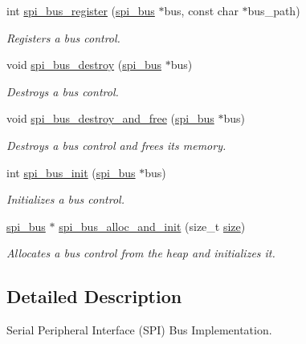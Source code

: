 \begin{DoxyCompactItemize}
\item 
int \mbox{\hyperlink{group__SPI_ga4e6ca0b1d473a6be4fbbefa2ed1a55f2}{spi\+\_\+bus\+\_\+register}} (\mbox{\hyperlink{structspi__bus}{spi\+\_\+bus}} $\ast$bus, const char $\ast$bus\+\_\+path)
\begin{DoxyCompactList}\small\item\em Registers a bus control. \end{DoxyCompactList}\item 
void \mbox{\hyperlink{group__SPI_ga6d316300e2bb231728d32b5dda355dcd}{spi\+\_\+bus\+\_\+destroy}} (\mbox{\hyperlink{structspi__bus}{spi\+\_\+bus}} $\ast$bus)
\begin{DoxyCompactList}\small\item\em Destroys a bus control. \end{DoxyCompactList}\item 
void \mbox{\hyperlink{group__SPI_ga6c6868bad5d8e9ea136b23947dd9a7a6}{spi\+\_\+bus\+\_\+destroy\+\_\+and\+\_\+free}} (\mbox{\hyperlink{structspi__bus}{spi\+\_\+bus}} $\ast$bus)
\begin{DoxyCompactList}\small\item\em Destroys a bus control and frees its memory. \end{DoxyCompactList}\item 
int \mbox{\hyperlink{group__SPI_ga262496c8e444706de1774f57e65fb783}{spi\+\_\+bus\+\_\+init}} (\mbox{\hyperlink{structspi__bus}{spi\+\_\+bus}} $\ast$bus)
\begin{DoxyCompactList}\small\item\em Initializes a bus control. \end{DoxyCompactList}\item 
\mbox{\hyperlink{structspi__bus}{spi\+\_\+bus}} $\ast$ \mbox{\hyperlink{group__SPI_ga009e374a9df42c65a879677a4434ed49}{spi\+\_\+bus\+\_\+alloc\+\_\+and\+\_\+init}} (size\+\_\+t \mbox{\hyperlink{sun4u_2tte_8h_a245260f6f74972558f61b85227df5aae}{size}})
\begin{DoxyCompactList}\small\item\em Allocates a bus control from the heap and initializes it. \end{DoxyCompactList}\end{DoxyCompactItemize}


\subsection{Detailed Description}
Serial Peripheral Interface (S\+PI) Bus Implementation. 


